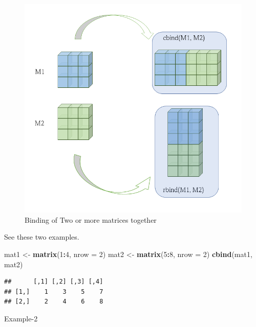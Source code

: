\documentclass[
]{book}
\newenvironment{Shaded}{\begin{snugshade}}{\end{snugshade}}
\newcommand{\AttributeTok}[1]{\textcolor[rgb]{0.13,0.29,0.53}{#1}}
\newcommand{\DecValTok}[1]{\textcolor[rgb]{0.00,0.00,0.81}{#1}}
\newcommand{\FunctionTok}[1]{\textcolor[rgb]{0.13,0.29,0.53}{\textbf{#1}}}
\newcommand{\NormalTok}[1]{#1}
\newcommand{\OtherTok}[1]{\textcolor[rgb]{0.56,0.35,0.01}{#1}}
\newcommand{\SpecialCharTok}[1]{\textcolor[rgb]{0.81,0.36,0.00}{\textbf{#1}}}
\begin{document}
\begin{figure}

{\centering \includegraphics[width=10.39in,height=0.6\textheight]{images/cbind_vs_rbind} 

}

\caption{Binding of Two or more matrices together}\label{fig:bind}
\end{figure}

See these two examples.

\begin{Shaded}
\begin{Highlighting}[]
\NormalTok{mat1 }\OtherTok{\textless{}{-}} \FunctionTok{matrix}\NormalTok{(}\DecValTok{1}\SpecialCharTok{:}\DecValTok{4}\NormalTok{, }\AttributeTok{nrow =} \DecValTok{2}\NormalTok{)}
\NormalTok{mat2 }\OtherTok{\textless{}{-}} \FunctionTok{matrix}\NormalTok{(}\DecValTok{5}\SpecialCharTok{:}\DecValTok{8}\NormalTok{, }\AttributeTok{nrow =} \DecValTok{2}\NormalTok{)}
\FunctionTok{cbind}\NormalTok{(mat1, mat2)}
\end{Highlighting}
\end{Shaded}

\begin{verbatim}
##      [,1] [,2] [,3] [,4]
## [1,]    1    3    5    7
## [2,]    2    4    6    8
\end{verbatim}

Example-2
\end{document}
